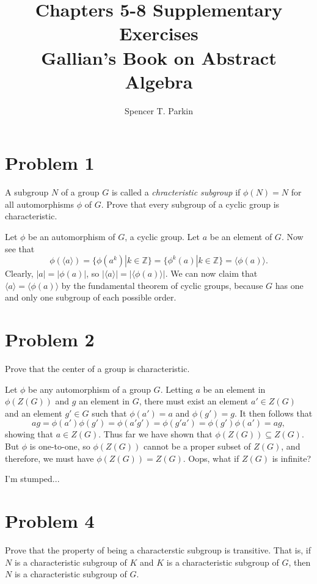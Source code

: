\documentclass[12pt]{article}
\title{Chapters 5-8 Supplementary Exercises\\Gallian's Book on Abstract Algebra}
\author{Spencer T. Parkin}
\newcommand{\Z}{\mathbb{Z}}
\begin{document}
\maketitle

\section*{Problem 1}

A subgroup $N$ of a group $G$ is called a {\it chracteristic subgroup} if $\phi(N)=N$
for all automorphisms $\phi$ of $G$.  Prove that every subgroup of a cyclic group is characteristic.

Let $\phi$ be an automorphism of $G$, a cyclic group.
Let $a$ be an element of $G$.  Now see that
\begin{equation*}
\phi(\langle a\rangle)=\{\phi(a^k)|k\in\Z\}=\{\phi^k(a)|k\in\Z\}=\langle\phi(a)\rangle.
\end{equation*}
Clearly, $|a|=|\phi(a)|$, so $|\langle a\rangle|=|\langle\phi(a)\rangle|$.  We can
now claim that $\langle a\rangle=\langle \phi(a)\rangle$ by the fundamental
theorem of cyclic groups, because $G$ has one and only one subgroup of each
possible order.

\section*{Problem 2}

Prove that the center of a group is characteristic.

Let $\phi$ be any automorphism of a group $G$.
Letting $a$ be an element in $\phi(Z(G))$ and $g$ an element in $G$,
there must exist an element $a'\in Z(G)$ and an element $g'\in G$ such
that $\phi(a')=a$ and $\phi(g')=g$.  It then follows that
\begin{equation*}
ag=\phi(a')\phi(g')=\phi(a'g')=\phi(g'a')=\phi(g')\phi(a')=ag,
\end{equation*}
showing that $a\in Z(G)$.
Thus far we have shown that $\phi(Z(G))\subseteq Z(G)$.
But $\phi$ is one-to-one, so $\phi(Z(G))$ cannot be a proper
subset of $Z(G)$, and therefore, we must have $\phi(Z(G))=Z(G)$.
Oops, what if $Z(G)$ is infinite?

I'm stumped...

\section*{Problem 4}

Prove that the property of being a characterstic subgroup is transitive.
That is, if $N$ is a characteristic subgroup of $K$ and $K$ is a characteristic
subgroup of $G$, then $N$ is a characteristic subgroup of $G$.
\end{document}
